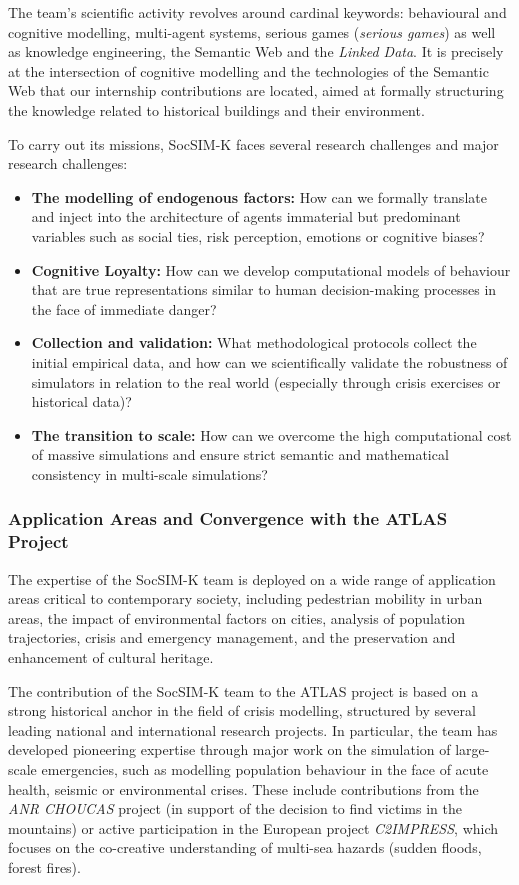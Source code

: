 \documentclass{article}
\begin{document}
The team's scientific activity revolves around cardinal keywords: behavioural and cognitive modelling, multi-agent systems, serious games (\textit{serious games}) as well as knowledge engineering, the Semantic Web and the \textit{Linked Data}. It is precisely at the intersection of cognitive modelling and the technologies of the Semantic Web that our internship contributions are located, aimed at formally structuring the knowledge related to historical buildings and their environment.

To carry out its missions, SocSIM-K faces several research challenges and major research challenges:
\begin{itemize}
\item \textbf {The modelling of endogenous factors:} How can we formally translate and inject into the architecture of agents immaterial but predominant variables such as social ties, risk perception, emotions or cognitive biases?
\item \textbf {Cognitive Loyalty:} How can we develop computational models of behaviour that are true representations similar to human decision-making processes in the face of immediate danger?
\item \textbf {Collection and validation:} What methodological protocols collect the initial empirical data, and how can we scientifically validate the robustness of simulators in relation to the real world (especially through crisis exercises or historical data)?
\item \textbf {The transition to scale:} How can we overcome the high computational cost of massive simulations and ensure strict semantic and mathematical consistency in multi-scale simulations?
\end{itemize}

\subsubsection{Application Areas and Convergence with the ATLAS Project}

The expertise of the SocSIM-K team is deployed on a wide range of application areas critical to contemporary society, including pedestrian mobility in urban areas, the impact of environmental factors on cities, analysis of population trajectories, crisis and emergency management, and the preservation and enhancement of cultural heritage.

The contribution of the SocSIM-K team to the ATLAS project is based on a strong historical anchor in the field of crisis modelling, structured by several leading national and international research projects. In particular, the team has developed pioneering expertise through major work on the simulation of large-scale emergencies, such as modelling population behaviour in the face of acute health, seismic or environmental crises. These include contributions from the \textit{ANR CHOUCAS} project (in support of the decision to find victims in the mountains) or active participation in the European project \textit{C2IMPRESS}, which focuses on the co-creative understanding of multi-sea hazards (sudden floods, forest fires).
\end{document}
